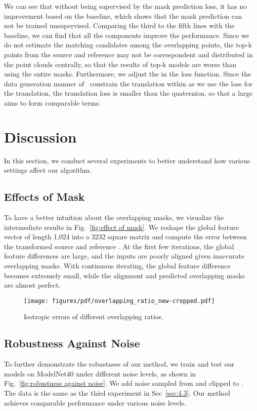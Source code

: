 \documentclass[10pt,twocolumn,letterpaper]{article}
\begin{document}
We can see that without being supervised by the mask prediction loss, it has no improvement based on the baseline, which shows that the mask prediction can not be trained unsupervised. Comparing the third to the fifth lines with the baseline, we can find that all the components improve the performance. Since we do not estimate the matching candidates among the overlapping points, the top-k points from the source and reference may not be correspondent and distributed in the point clouds centrally, so that the results of top-k models are worse than using the entire masks. Furthermore, we adjust the  in the loss function. Since the data generation manner of~\cite{wang2019prnet, yew2020-RPMNet} constrain the translation within  as we use the  loss for the translation, the translation loss is smaller than the quaternion, so that a large  aims to form comparable terms. 
\section{Discussion}
In this section, we conduct several experiments to better understand how various settings affect our algorithm. 

\subsection{Effects of Mask}
To have a better intuition about the overlapping masks, we visualize the intermediate results in Fig.~\ref{fig:effect of mask}. We reshape the global feature vector of length 1,024 into a 3232 square matrix and compute the error between the transformed source  and reference . At the first few iterations, the global feature differences are large, and the inputs are poorly aligned given inaccurate overlapping masks. With continuous iterating, the global feature difference becomes extremely small, while the alignment and predicted overlapping masks are almost perfect.

\begin{figure}[t]
    \centering
    \texttt{[image: figures/pdf/overlapping\_ratio\_new-cropped.pdf]}\\
    \caption{Isotropic errors of different overlapping ratios.}
\vspace{-0.37cm}
    \label{fig:different overlapping ratio}
\end{figure} \subsection{Robustness Against Noise}
To further demonstrate the robustness of our method, we train and test our models on ModelNet40 under different noise levels, as shown in Fig.~\ref{fig:robustness against noise}. We add noise sampled from  and clipped to . The data is the same as the third experiment in Sec~\ref{sec:4.3}. Our method achieves comparable performance under various noise levels.
\end{document}
